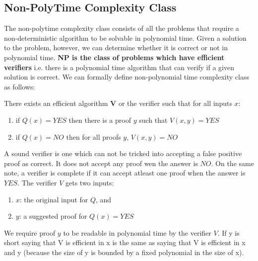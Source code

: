  \subsection{Non-PolyTime Complexity Class}
 The non-polytime complexity class consists of all the problems that require a non-deterministic algorithm to be solvable in polynomial time. Given a solution to the problem, however, we can determine whether it is correct or not in polynomial time. \textbf{NP is the class of problems which have efficient verifiers} i.e. there is a polynomial time algorithm that can verify if a given solution is correct. We can formally define non-polynomial time complexity class as follows:
 
There exists an efficient algorithm $\textbf{V}$ or the verifier such that for all inputs $x$:
\begin{enumerate}
    \item if $Q(x) = YES$ then there is a proof $y$ such that $V(x,y) = YES$
    \item if $Q(x) = NO$ then for all proofs $y$, $V(x,y) = NO$
\end{enumerate}

A sound verifier is one which can not be tricked into accepting a false positive proof as correct. It does not accept any proof wen the answer is $NO$. On the same note, a verifier is complete if it can accept atleast one proof when the answer is $YES$. The verifier $V$ gets two inputs:

\begin{enumerate}
    \item $x$: the original input for $Q$, and
    \item $y$: a suggested proof for $Q(x) = YES$
\end{enumerate}

We require proof $y$ to be readable in polynomial time by the verifier $V$. If y is short saying that V is efficient in x is the same as saying that V is efficient in x and y (because the size of y is bounded by a fixed polynomial in the size of x).
